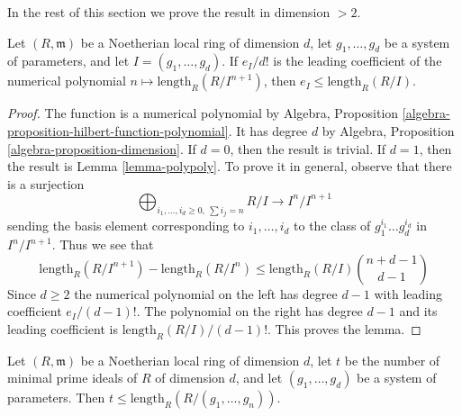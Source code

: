 \noindent
In the rest of this section we prove the result in dimension $> 2$.

\begin{lemma}
\label{lemma-multiplicity}
Let $(R, \mathfrak m)$ be a Noetherian local ring of dimension $d$, let
$g_1, \ldots, g_d$ be a system of parameters, and let
$I = (g_1, \ldots, g_d)$. If $e_I/d!$ is the leading coefficient of the
numerical polynomial
$n \mapsto \text{length}_R(R/I^{n+1})$, then $e_I \leq \text{length}_R(R/I)$.
\end{lemma}

\begin{proof}
The function is a numerical polynomial by
Algebra, Proposition \ref{algebra-proposition-hilbert-function-polynomial}.
It has degree $d$ by
Algebra, Proposition \ref{algebra-proposition-dimension}.
If $d = 0$, then the result is trivial.
If $d = 1$, then the result is Lemma \ref{lemma-polypoly}.
To prove it in general, observe that there is a surjection
$$
\bigoplus\nolimits_{i_1, \ldots, i_d \geq 0,\ \sum i_j = n} R/I
\longrightarrow
I^n/I^{n + 1}
$$
sending the basis element corresponding to $i_1, \ldots, i_d$
to the class of $g_1^{i_1} \ldots g_d^{i_d}$ in $I^n/I^{n + 1}$.
Thus we see that
$$
\text{length}_R(R/I^{n + 1}) - \text{length}_R(R/I^n)
\leq  \text{length}_R(R/I) {n + d - 1 \choose d - 1}
$$
Since $d \geq 2$ the numerical polynomial on the left has
degree $d - 1$ with leading coefficient $e_I / (d - 1)!$.
The polynomial on the right has degree $d - 1$ and its
leading coefficient is $\text{length}_R(R/I)/ (d - 1)!$.
This proves the lemma.
\end{proof}

\begin{lemma}
\label{lemma-minprimespolyhigher}
Let $(R, \mathfrak m)$ be a Noetherian local ring of dimension $d$, let $t$
be the number of minimal prime ideals of $R$ of dimension $d$, and let
$(g_1,\ldots,g_d)$ be a system of parameters. Then
$t \leq \text{length}_R(R/(g_1,\ldots,g_n))$.
\end{lemma}

